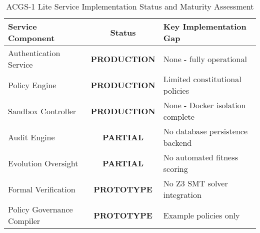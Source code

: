 \documentclass[manuscript,screen,9pt]{acmart}
\newcommand{\tablesize}{\footnotesize}
\newcommand{\tableheader}[1]{\textbf{#1}}
\begin{document}
\begin{table}[!htb]
\centering
\caption{ACGS-1 Lite Service Implementation Status and Maturity Assessment}
\label{tab:implementation_status}
\tablesize
\begin{tabular}{@{}lcl@{}}
\toprule
\tableheader{Service Component} & \tableheader{Status} & \tableheader{Key Implementation Gap} \\
\midrule
Authentication Service & \textbf{PRODUCTION} & None - fully operational \\
Policy Engine & \textbf{PRODUCTION} & Limited constitutional policies \\
Sandbox Controller & \textbf{PRODUCTION} & None - Docker isolation complete \\
\midrule
Audit Engine & \textbf{PARTIAL} & No database persistence backend \\
Evolution Oversight & \textbf{PARTIAL} & No automated fitness scoring \\
\midrule
Formal Verification & \textbf{PROTOTYPE} & No Z3 SMT solver integration \\
Policy Governance Compiler & \textbf{PROTOTYPE} & Example policies only \\
\bottomrule
\end{tabular}
\end{table}
\end{document}

